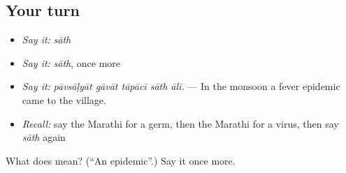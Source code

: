 \subsection*{Your turn}
\begin{itemize}
\raggedright
  \item \emph{Say it:} \emph{sāth}
  \item \emph{Say it:} \emph{sāth}, once more
  \item \emph{Say it:} \emph{pāvsāḷyāt gāvāt tāpācī sāth ālī.} — In the monsoon a fever epidemic came to the village.
  \item \emph{Recall:} say the Marathi for a germ, then the Marathi for a virus, then say \emph{sāth} again
\end{itemize}

\begin{tcolorbox}[breakable,colback=teal!4,colframe=teal!35!black,title={Before you move on}]
What does  mean? (\textquotedblleft{}An epidemic\textquotedblright{}.) Say it once more.
\end{tcolorbox}
